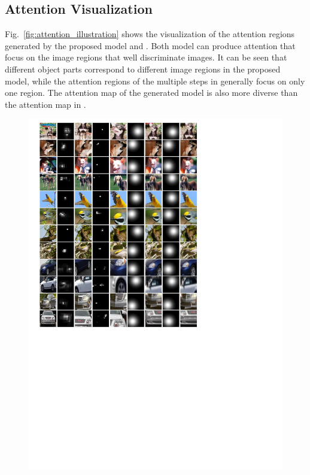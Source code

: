 \documentclass[10pt,twocolumn,letterpaper]{article}
\begin{document}
\subsection{Attention Visualization}
Fig.~\ref{fig:attention_illustration} shows the visualization of the attention regions generated by the proposed model and \cite{bd3}.
Both model can produce attention that focus on the image regions that well discriminate images.
It can be seen that different object parts correspond to different image regions in the proposed model, while the attention regions of the multiple steps in \cite{bd3} generally focus on only one region.
The attention map of the generated model is also more diverse than the attention map in \cite{bd3}.


\begin{figure}[!t]
\begin{center}
\includegraphics[scale = 0.8]{3.pdf}
\end{center}

\end{figure}
\end{document}
